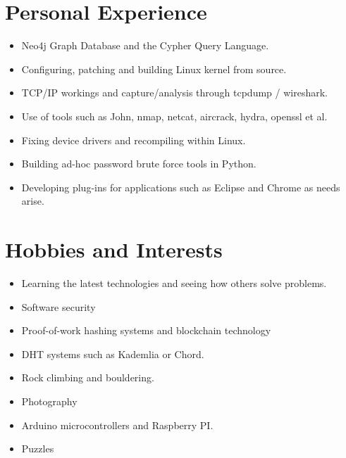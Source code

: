 \documentclass[a4paper,10pt]{moderncv}
\begin{document}
\section{Personal Experience}
\begin{itemize}
\item Neo4j Graph Database and the Cypher Query Language.
\item Configuring, patching and building Linux kernel from source.
\item TCP/IP workings and capture/analysis through tcpdump / wireshark.
\item Use of tools such as John, nmap, netcat, aircrack, hydra, openssl et al.
\item Fixing device drivers and recompiling within Linux.
\item Building ad-hoc password brute force tools in Python.
\item Developing plug-ins for applications such as Eclipse and Chrome as needs arise.
\end{itemize}

\section{Hobbies and Interests}
\begin{itemize}
\item Learning the latest technologies and seeing how others solve problems.
\item Software security
\item Proof-of-work hashing systems and blockchain technology
\item DHT systems such as Kademlia or Chord.
\item Rock climbing and bouldering.
\item Photography
\item Arduino microcontrollers and Raspberry PI.
\item Puzzles
\end{itemize}
\end{document}
